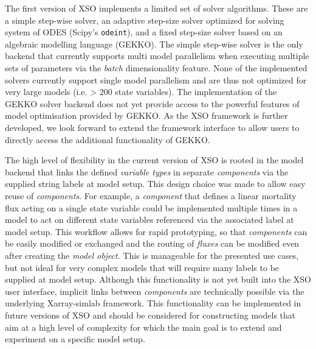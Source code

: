 \documentclass[journal abbreviation, manuscript]{copernicus}
\begin{document}
The first version of XSO implements a limited set of solver algorithms. These are a simple step-wise solver, an adaptive step-size solver optimized for solving system of ODES (Scipy's \texttt{odeint}), and a fixed step-size solver based on an algebraic modelling language (GEKKO). The simple step-wise solver is the only backend that currently supports multi model parallelism when executing multiple sets of parameters via the \textit{batch} dimensionality feature. None of the implemented solvers currently support single model parallelism and are thus not optimized for very large models (i.e. > 200 state variables).
The implementation of the GEKKO solver backend does not yet provide access to the powerful features of model optimisation provided by GEKKO. As the XSO framework is further developed, we look forward to extend the framework interface to allow users to directly access the additional functionality of GEKKO.

The high level of flexibility in the current version of XSO is rooted in the model backend that links the defined \textit{variable types} in separate \textit{components} via the supplied string labels at model setup. This design choice was made to allow easy reuse of \textit{components}. For example, a \textit{component} that defines a linear mortality flux acting on a single state variable could be implemented multiple times in a model to act on different state variables referenced via the associated label at model setup. This workflow allows for rapid prototyping, so that \textit{components} can be easily modified or exchanged and the routing of \textit{fluxes} can be modified even after creating the \textit{model object}. This is manageable for the presented use cases, but not ideal for very complex models that will require many labels to be supplied at model setup. Although this functionality is not yet built into the XSO user interface, implicit links between \textit{components} are technically possible via the underlying Xarray-simlab framework. This functionality can be implemented in future versions of XSO and should be considered for constructing models that aim at a high level of complexity for which the main goal is to extend and experiment on a specific model setup.
\end{document}
